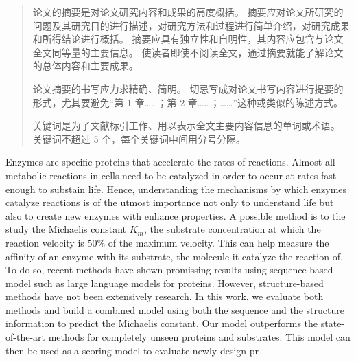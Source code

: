 

\begin{abstract}
  论文的摘要是对论文研究内容和成果的高度概括。
  摘要应对论文所研究的问题及其研究目的进行描述，对研究方法和过程进行简单介绍，对研究成果和所得结论进行概括。
  摘要应具有独立性和自明性，其内容应包含与论文全文同等量的主要信息。
  使读者即使不阅读全文，通过摘要就能了解论文的总体内容和主要成果。

  论文摘要的书写应力求精确、简明。
  切忌写成对论文书写内容进行提要的形式，尤其要避免“第 1 章……；第 2 章……；……”这种或类似的陈述方式。

  关键词是为了文献标引工作、用以表示全文主要内容信息的单词或术语。
  关键词不超过 5 个，每个关键词中间用分号分隔。

\end{abstract}

\begin{abstract*}
  Enzymes are specific proteins that accelerate the rates of reactions. 
  Almost all metabolic reactions in cells need to be catalyzed in order to occur at 
  rates fast enough to substain life. Hence, understanding the mechanisms by which enzymes
  catalyze reactions is of the utmost importance not only to understand life but also to
  create new enzymes with enhance properties. A possible method is to the study the 
  Michaelis constant $K_m$, the substrate concentration at which the reaction velocity
  is 50\% of the maximum velocity. This can help measure the affinity of an enzyme with
  its substrate, the molecule it catalyze the reaction of. To do so, recent methods have
  shown promissing results using sequence-based model such as large language models for
  proteins. However, structure-based methods have not been extensively research. In this
  work, we evaluate both methods and build a combined model using both the sequence and 
  the structure information to predict the Michaelis constant. Our model outperforms
  the state-of-the-art methods for completely unseen proteins and substrates. This model
  can then be used as a scoring model to evaluate newly design pr

\end{abstract*}
